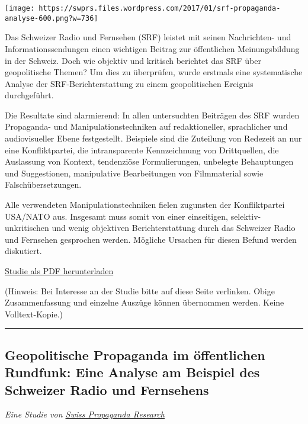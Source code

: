 \texttt{[image: https://swprs.files.wordpress.com/2017/01/srf-propaganda-analyse-600.png?w=736]}

Das Schweizer Radio und Fernsehen (SRF) leistet mit seinen Nachrichten-
und Informations­sendungen einen wichtigen Beitrag zur öffentlichen
Meinungsbildung in der Schweiz. Doch wie objektiv und kritisch berichtet
das SRF über geopolitische Themen? Um dies zu überprüfen, wurde erstmals
eine systematische Analyse der SRF-Berichterstattung zu einem
geopolitischen Ereignis durchgeführt.

Die Resultate sind alarmierend: In allen untersuchten Beiträgen des SRF
wurden Propaganda- und Manipulationstechniken auf redaktioneller,
sprachlicher und audiovisueller Ebene festgestellt. Beispiele sind die
Zuteilung von Redezeit an nur eine Konfliktpartei, die intransparente
Kennzeichnung von Drittquellen, die Auslassung von Kontext, tendenziöse
Formulierungen, unbelegte Behauptungen und Suggestionen, manipulative
Bearbei­tungen von Film­material sowie Falschübersetzungen.

Alle verwendeten Manipulationstechniken fielen zugunsten der
Konfliktpartei USA/NATO aus. Insgesamt muss somit von einer einseitigen,
selektiv-unkritischen und wenig objektiven Berichterstattung durch das
Schweizer Radio und Fernsehen gesprochen werden. Mögliche Ursachen für
diesen Befund werden diskutiert.

\href{https://swprs.files.wordpress.com/2017/11/srf-propaganda-analyse-2016-tp.pdf}{Studie
als PDF herunterladen}

(Hinweis: Bei Interesse an der Studie bitte auf diese Seite verlinken.
Obige Zusammen­fassung und einzelne Auszüge können übernommen werden.
Keine Volltext-Kopie.)

\begin{center}\rule{0.5\linewidth}{\linethickness}\end{center}

\hypertarget{geopolitische-propaganda-im-uxf6ffentlichen-rundfunk-eine-analyse-am-beispiel-des-schweizer-radio-und-fernsehens}{%
\subsection{Geopolitische Propaganda im öffentlichen Rundfunk: Eine
Analyse am Beispiel des Schweizer Radio und
Fernsehens}\label{geopolitische-propaganda-im-uxf6ffentlichen-rundfunk-eine-analyse-am-beispiel-des-schweizer-radio-und-fernsehens}}

\emph{Eine Studie von \href{https://swprs.org/}{Swiss Propaganda
Research}}

